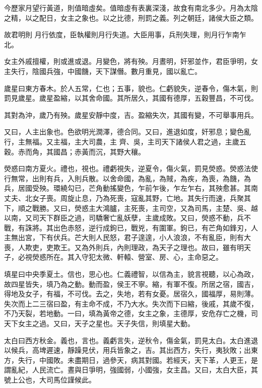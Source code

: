 \begin{pinyinscope}
 今歷家月望行黃道，則值暗虛矣。值暗虛有表裏深淺，故食有南北多少。月為太陰之精，以之配日，女主之象也。以之比德，刑罰之義。列之朝廷，諸侯大臣之類。



 故君明則
 月行依度，臣執權則月行失道。大臣用事，兵刑失理，則月行乍南乍北。



 女主外戚擅權，則或進或退。月變色，將有殃。月晝明，奸邪並作，君臣爭明，女主失行，陰國兵強，中國饑，天下謀僭。數月重見，國以亂亡。



 歲星曰東方春木。於人五常，仁也；五事，貌也。仁虧貌失，逆春令，傷木氣，則罰見歲星。歲星盈縮，以其舍命國。其所居久，其國有德厚，五穀豐昌，不可伐。



 其對為沖，歲乃有殃。歲星安靜中度，吉。盈縮失次，其國有變，不可舉事用兵。



 又曰，人主出象也。色欲明光潤澤，德合同。又曰，進退如度，奸邪息；變色亂行，主無福。又主福，主大司農，主
 齊、吳，主司天下諸侯人君之過，主歲五穀。赤而角，其國昌；赤黃而沉，其野大穰。



 熒惑曰南方夏火。禮也，視也。禮虧視失，逆夏令，傷火氣，罰見熒惑。熒惑法使行無常，出則有兵，入則兵散。以舍命國，為亂，為賊，為疾，為喪，為饑，為兵，居國受殃。環繞勾已，芒角動搖變色，乍前乍後，乍左乍右，其殃愈甚。其南丈夫、北女子喪。周旋止息，乃為死喪，寇亂其野，亡地。其失行而速，兵聚其下，順之戰勝。又曰，熒惑主大鴻臚，主死喪，主司空，又為司馬，主楚、吳、越以南，又司天下群臣之過，司驕奢亡亂妖孽，主歲成敗。又曰，熒惑不動，兵不
 戰，有誅將。其出色赤怒，逆行成鉤已，戰兇，有圍軍。鉤已，有芒角如鋒刃，人主無出宮，下有伏兵。芒大則人民怒，君子遑遑，小人浪浪，不有亂臣，則有大喪，人欺吏，吏欺王。又為外則兵，內則理政，為天子之理也。故曰，雖有明天子，必視熒惑所在。其入守犯太微、軒轅、營室、房、心，主命惡之。



 填星曰中央季夏土。信也，思心也。仁義禮智，以信為主，貌言視聽，以心為政，故四星皆失，填乃為之動。動而盈，侯王不寧。縮，有軍不復。所居之宿，國吉，得地及女子，有福，不可伐。去之，失地，若有女憂。居宿久，國福厚，易則薄。
 失次而上二三宿曰盈，有主命不成，不乃大水。失次而下曰縮，後戚，其歲不復，不乃天裂，若地動。一曰，填為黃帝之德，女主之象，主德厚，安危存亡之機，司天下女主之過。又曰，天子之星也。天子失信，則填星大動。



 太白曰西方秋金。義也，言也。義虧言失，逆秋令，傷金氣，罰見太白。太白進退以候兵，高埤遲速，靜躁見伏，用兵皆象之，吉。其出西方，失行，夷狄敗；出東方，失行，中國敗。未盡期日，過參天，病其對國。若經天，天下革，人更王，是謂亂紀，人民流亡。晝與日爭明，強國弱，小國強，女主昌。又曰，太白大臣，其號上公也，大司馬位謹候此。




\end{pinyinscope}
